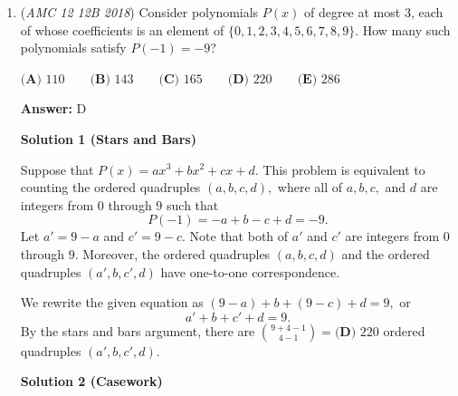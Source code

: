 \begin{enumerate}
 


	\item (\textit{AMC 12 12B 2018}) Consider polynomials $P(x)$ of degree at most $3$, each of whose coefficients is an element of $\{0, 1, 2, 3, 4, 5, 6, 7, 8, 9\}$. How many such polynomials satisfy $P(-1) = -9$?


 $\textbf{(A) } 110 \qquad \textbf{(B) } 143 \qquad \textbf{(C) } 165 \qquad \textbf{(D) } 220 \qquad \textbf{(E) } 286$

 \textbf{Answer: }D



\textbf{Solution 1 (Stars and Bars)}

Suppose that $P(x)=ax^3+bx^2+cx+d.$ This problem is equivalent to counting the ordered quadruples $(a,b,c,d),$ where all of $a,b,c,$ and $d$ are integers from $0$ through $9$ such that 
 \[P(-1)=-a+b-c+d=-9.\] Let $a'=9-a$ and $c'=9-c.$ Note that both of $a'$ and $c'$ are integers from $0$ through $9.$ Moreover, the ordered quadruples $(a,b,c,d)$ and the ordered quadruples $(a',b,c',d)$ have one-to-one correspondence.

 We rewrite the given equation as $(9-a)+b+(9-c)+d=9,$ or 
 \[a'+b+c'+d=9.\] By the stars and bars argument, there are $\binom{9+4-1}{4-1}=\boxed{\textbf{(D) } 220}$ ordered quadruples $(a',b,c',d).$




\textbf{Solution 2 (Casework)}


\end{enumerate}
